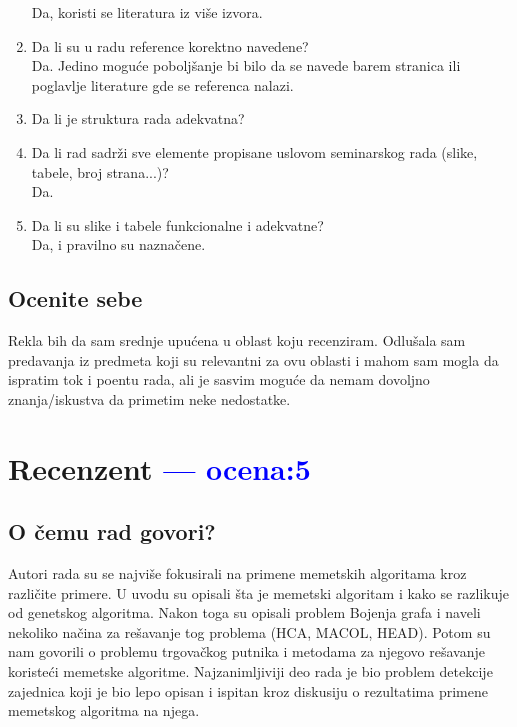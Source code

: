 \documentclass[a4paper]{report}
\newcommand{\odgovor}[1]{\textcolor{blue}{#1}}
\begin{document}
\begin{enumerate}
Da, koristi se literatura iz više izvora.
\item Da li su u radu reference korektno navedene?\\
Da. Jedino moguće poboljšanje bi bilo da se navede barem stranica ili poglavlje literature gde se referenca nalazi.
\item Da li je struktura rada adekvatna?\\
\item Da li rad sadrži sve elemente propisane uslovom seminarskog rada (slike, tabele, broj strana...)?\\
Da.
\item Da li su slike i tabele funkcionalne i adekvatne?\\
Da, i pravilno su naznačene.
\end{enumerate}

\section{Ocenite sebe}
Rekla bih da sam srednje upućena u oblast koju recenziram. Odlušala sam predavanja iz predmeta koji su relevantni za ovu oblasti i mahom sam mogla da ispratim tok i poentu rada, ali je sasvim moguće da nemam dovoljno znanja/iskustva da primetim neke nedostatke.

\chapter{Recenzent \odgovor{--- ocena:5} }


\section{O čemu rad govori?}
Autori rada su se najviše fokusirali na primene memetskih algoritama kroz različite primere. U uvodu su opisali šta je memetski algoritam i kako se razlikuje od genetskog algoritma. Nakon toga su opisali problem Bojenja grafa i naveli nekoliko načina za rešavanje tog problema (HCA, MACOL, HEAD). Potom su nam govorili o problemu trgovačkog putnika i metodama za njegovo rešavanje koristeći memetske algoritme. Najzanimljiviji deo rada je bio problem detekcije zajednica koji je bio lepo opisan i ispitan kroz diskusiju o rezultatima primene memetskog algoritma na njega.
\end{document}

